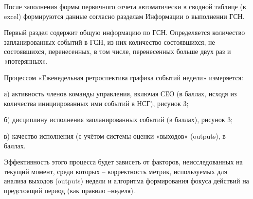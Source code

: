 
После заполнения формы первичного отчета автоматически в сводной таблице
(в excel) формируются данные согласно разделам Информации о выполнении
ГСН.

Первый раздел содержит общую информацию по ГСН. Определяется количество
запланированных событий в ГСН, из них количество состоявшихся, не
состоявшихся, перенесенных, в том числе, перенесенных больше двух раз и
«потерянных».

Процессом «Еженедельная ретроспектива графика событий недели»
измеряется:

а) активность членов команды управления, включая СЕО (в баллах, исходя
из количества инициированных ими событий в НСГ), рисунок 3;

б) дисциплину исполнения запланированных событий (в баллах), рисунок 3;

в) качество исполнения (с учётом системы оценки «выходов» (outputs), в
баллах.

Эффективность этого процесса будет зависеть от факторов, неисследованных
на текущий момент, среди которых -- корректность метрик, используемых
для анализа выходов (outputs) недели и алгоритма формирования фокуса
действий на предстоящий период (как правило --неделя).

